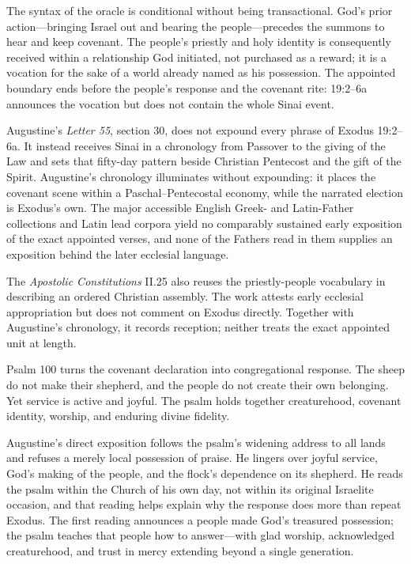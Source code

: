 The syntax of the oracle is conditional without being transactional. God's prior action---bringing Israel out and bearing the people---precedes the summons to hear and keep covenant. The people's priestly and holy identity is consequently received within a relationship God initiated, not purchased as a reward; it is a vocation for the sake of a world already named as his possession. The appointed boundary ends before the people's response and the covenant rite: 19:2--6a announces the vocation but does not contain the whole Sinai event.

Augustine's \emph{Letter 55}, section 30, does not expound every phrase of Exodus 19:2--6a. It instead receives Sinai in a chronology from Passover to the giving of the Law and sets that fifty-day pattern beside Christian Pentecost and the gift of the Spirit. Augustine's chronology illuminates without expounding: it places the covenant scene within a Paschal--Pentecostal economy, while the narrated election is Exodus's own. The major accessible English Greek- and Latin-Father collections and Latin lead corpora yield no comparably sustained early exposition of the exact appointed verses, and none of the Fathers read in them supplies an exposition behind the later ecclesial language.

The \emph{Apostolic Constitutions} II.25 also reuses the priestly-people vocabulary in describing an ordered Christian assembly. The work attests early ecclesial appropriation but does not comment on Exodus directly. Together with Augustine's chronology, it records reception; neither treats the exact appointed unit at length.

Psalm 100 turns the covenant declaration into congregational response. The sheep do not make their shepherd, and the people do not create their own belonging. Yet service is active and joyful. The psalm holds together creaturehood, covenant identity, worship, and enduring divine fidelity.

Augustine's direct exposition follows the psalm's widening address to all lands and refuses a merely local possession of praise. He lingers over joyful service, God's making of the people, and the flock's dependence on its shepherd. He reads the psalm within the Church of his own day, not within its original Israelite occasion, and that reading helps explain why the response does more than repeat Exodus. The first reading announces a people made God's treasured possession; the psalm teaches that people how to answer---with glad worship, acknowledged creaturehood, and trust in mercy extending beyond a single generation.

